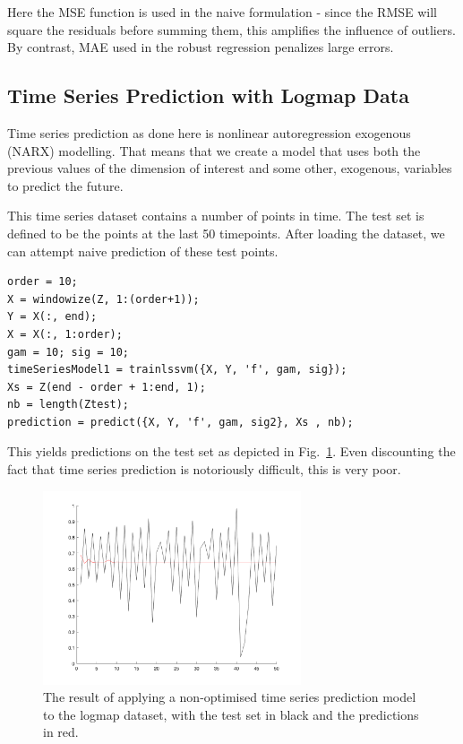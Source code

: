 \documentclass[10pt,a4paper]{article}
\begin{document}
Here the MSE function is used in the naive formulation - since the RMSE will square the residuals before summing them, this amplifies the influence of outliers. By contrast, MAE used in the robust regression penalizes large errors.

\subsection{Time Series Prediction with Logmap Data}
Time series prediction as done here is nonlinear autoregression exogenous (NARX) modelling. That means that we create a model that uses both the previous values of the dimension of interest and some other, exogenous, variables to predict the future.

This time series dataset contains a number of points in time. The test set is defined to be the points at the last 50 timepoints. After loading the dataset, we can attempt naive prediction of these test points.

\begin{lstlisting}[style=Matlab-editor]
order = 10;
X = windowize(Z, 1:(order+1));
Y = X(:, end);
X = X(:, 1:order);
gam = 10; sig = 10;
timeSeriesModel1 = trainlssvm({X, Y, 'f', gam, sig});
Xs = Z(end - order + 1:end, 1);
nb = length(Ztest);
prediction = predict({X, Y, 'f', gam, sig2}, Xs , nb);
\end{lstlisting}

This yields predictions on the test set as depicted in Fig.~\ref{fig:logmapNaive}. Even discounting the fact that time series prediction is notoriously difficult, this is very poor.

\begin{figure}[h!]
  \includegraphics[width=3in]{logmapNaive.png}
  \caption{The result of applying a non-optimised time series prediction model to the logmap dataset, with the test set in black and the predictions in red.}
  \label{fig:logmapNaive}
\end{figure}
 




\end{document}
